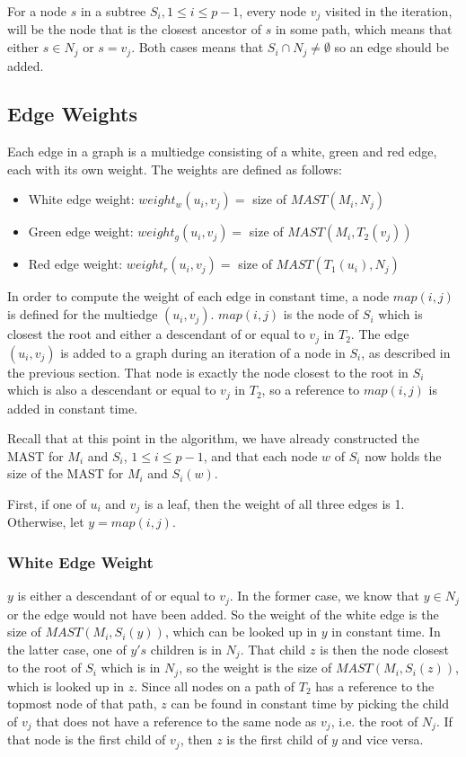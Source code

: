 For a node $s$ in a subtree $S_i, 1 \le i \le p-1$, every node $v_j$ visited in the iteration, will be the node that is the closest ancestor of $s$ in some path, which means that either $s \in N_j$ or $s=v_j$. Both cases means that $S_i \cap N_j \ne \emptyset$ so an edge should be added.

\subsection{Edge Weights}
Each edge in a graph is a multiedge consisting of a white, green and red edge, each with its own weight. The weights are defined as follows:
\begin{itemize}
	\item White edge weight: $weight_w(u_i, v_j)=$ size of $MAST(M_i,N_j)$
	\item Green edge weight: $weight_g(u_i, v_j)=$ size of $MAST(M_i,T_2(v_j))$
	\item Red edge weight: $weight_r(u_i, v_j)=$ size of $MAST(T_1(u_i),N_j)$
\end{itemize}

In order to compute the weight of each edge in constant time, a node $map(i,j)$ is defined for the multiedge $(u_i,v_j)$. $map(i,j)$ is the node of $S_i$ which is closest the root and either a descendant of or equal to $v_j$ in $T_2$. The edge $(u_i,v_j)$ is added to a graph during an iteration of a node in $S_i$, as described in the previous section. That node is exactly the node closest to the root in $S_i$ which is also a descendant or equal to $v_j$ in $T_2$, so a reference to $map(i,j)$ is added in constant time.

Recall that at this point in the algorithm, we have already constructed the MAST for $M_i$ and $S_i$, $1 \le i \le p-1$, and that each node $w$ of $S_i$ now holds the size of the MAST for $M_i$ and $S_i(w)$.

First, if one of $u_i$ and $v_j$ is a leaf, then the weight of all three edges is 1. Otherwise, let $y=map(i,j)$.

\subsubsection{White Edge Weight}
$y$ is either a descendant of or equal to $v_j$. In the former case, we know that $y \in N_j$ or the edge would not have been added. So the weight of the white edge is the size of $MAST(M_i, S_i(y))$, which can be looked up in $y$ in constant time. In the latter case, one of $y's$ children is in $N_j$. That child $z$ is then the node closest to the root of $S_i$ which is in $N_j$, so the weight is the size of $MAST(M_i, S_i(z))$, which is looked up in $z$. Since all nodes on a path of $T_2$ has a reference to the topmost node of that path, $z$ can be found in constant time by picking the child of $v_j$ that does not have a reference to the same node as $v_j$, i.e. the root of $N_j$. If that node is the first child of $v_j$, then $z$ is the first child of $y$ and vice versa.


